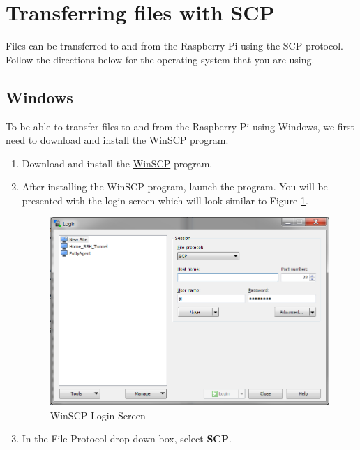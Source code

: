\documentclass{article}
\begin{document}
\section{Transferring files with SCP}

Files can be transferred to and from the Raspberry Pi using the SCP protocol. Follow the directions below for the operating system that you are using.


	\subsection{Windows}
	
	To be able to transfer files to and from the Raspberry Pi using Windows, we first need to download and install the WinSCP program.
	
	
		\begin{enumerate}[1.)]
			\item Download and install the \href{https://winscp.net/download/WinSCP-5.11.1-Setup.exe}{WinSCP} program.
			
			\item After installing the WinSCP program, launch the program. You will be presented with the login screen which will look similar to Figure \ref{WinSCP_Login}.
			
				\begin{figure}[H]
					\centering
					\includegraphics[width=\textwidth / 2]{pics/WinSCP_login.png}
					\caption{WinSCP Login Screen}
					\label{WinSCP_Login}
				\end{figure}
			
			\item In the File Protocol drop-down box, select \textbf{SCP}.
			

\end{enumerate}
\end{document}

